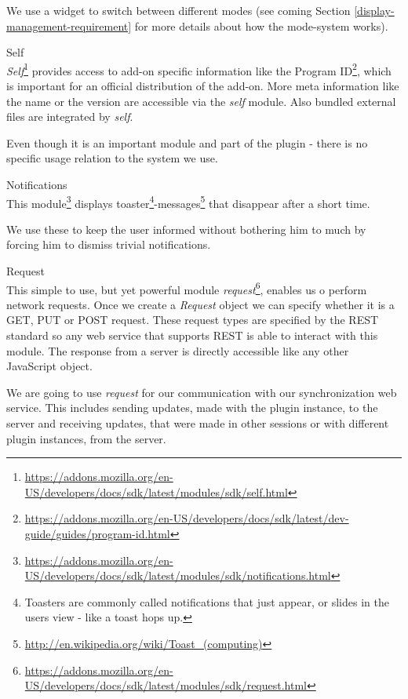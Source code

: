 \begin{description}
We use a widget to switch between different modes (see coming Section \ref{display-management-requirement} for more details about how the mode-system works).

\item Self\\
\emph{Self}\footnote{\url{https://addons.mozilla.org/en-US/developers/docs/sdk/latest/modules/sdk/self.html}} provides access to add-on specific information like the Program ID\footnote{\url{https://addons.mozilla.org/en-US/developers/docs/sdk/latest/dev-guide/guides/program-id.html}}, which is important for an official distribution of the add-on. More meta information like the name or the version are accessible via the \emph{self} module. Also bundled external files are integrated by \emph{self}.

Even though it is an important module and part of the plugin - there is no specific usage relation to the system we use. 

\item Notifications\\
This module\footnote{\url{https://addons.mozilla.org/en-US/developers/docs/sdk/latest/modules/sdk/notifications.html}} displays toaster\footnote{Toasters are commonly called notifications that just appear, or slides in the users view - like a toast hops up.}-messages\footnote{\url{http://en.wikipedia.org/wiki/Toast_(computing)}} that disappear after a short time.

We use these to keep the user informed without bothering him to much by forcing him to dismiss trivial notifications.

\item Request\\
This simple to use, but yet powerful module \emph{request}\footnote{\url{https://addons.mozilla.org/en-US/developers/docs/sdk/latest/modules/sdk/request.html}}, enables us o perform network requests. Once we create a \emph{Request} object we can specify whether it is a GET, PUT or POST request. These request types are specified by the REST standard so any web service that supports REST is able to interact with this module\cite{fielding2000principled}. The response from a server is directly accessible like any other JavaScript object. 

We are going to use \emph{request} for our communication with our synchronization web service. This includes sending updates, made with the plugin instance, to the server and receiving updates, that were made in other sessions or with different plugin instances, from the server. 

\end{description}

